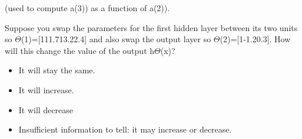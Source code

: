 \documentclass[11pt]{article} %
\begin{document}
(used to compute a(3)) as a function of a(2)). 

Suppose you swap the parameters for the first hidden layer between its two units so $\Theta$(1)=[111.713.22.4] and also swap the output layer so $\Theta$(2)=[1-1.20.3]. How will this change the value of the output h$\Theta$(x)?

\begin{itemize}
	
	\item It will stay the same.
	
	\item It will increase.
	
	\item It will decrease
	
	\item Insufficient information to tell: it may increase or decrease.
	
\end{itemize}
\end{document}
